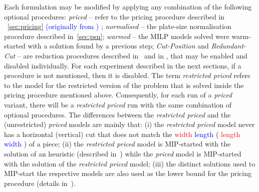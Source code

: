 \documentclass[ppgc,tese,english,formais,babel]{iiufrgs}
\newif\iffinalversion
\newcommand{\newtext}[1]{\iffinalversion%
#1%
\else%
\textcolor{blue}{#1}%
\fi%
}
\newcommand{\oldtext}[1]{\iffinalversion%
\else%
\textcolor{red}{#1}%
\fi%
}
\begin{document}
Each formulation may be modified by applying any combination of the following optional procedures:
\emph{priced} -- refer to the pricing procedure described in\newtext{~\cref{sec:pricing} (originally from \citet{dimitri_thesis})}\oldtext{\citet{dimitri_thesis}};
\emph{normalised} -- the plate-size normalisation procedure described in~\cref{sec:psn};
\emph{warmed} -- the MILP models solved were warm-started with a solution found by a previous step;
\emph{Cut-Position} and \emph{Redundant-Cut} -- are reduction procedures described in~\citet{furini:2016} and in \citet{dimitri_thesis}, that may be enabled and disabled individually.
For each experiment described in the next sections, if a procedure is not mentioned, then it is disabled.
The term \emph{restricted priced} refers to the model for the restricted version of the problem that is solved inside the pricing procedure mentioned above.
Consequently, for each run of a \emph{priced} variant, there will be a \emph{restricted priced} run with the same combination of optional procedures.
The differences between the \emph{restricted priced} and the (unrestricted) \emph{priced} models are mainly that:
(i) the \emph{restricted priced} model never has a horizontal (vertical) cut that does not match the \oldtext{width}\newtext{length} (\oldtext{length}\newtext{width}) of a piece;
(ii) the \emph{restricted priced} model is MIP-started with the solution of an heuristic (described in~\citet{dimitri_thesis}) while the \emph{priced} model is MIP-started with the solution of the \emph{restricted priced} model;
(iii) the distinct solutions used to MIP-start the respective models are also used as the lower bound for the pricing procedure (details in~\citet{dimitri_thesis}).
\end{document}
